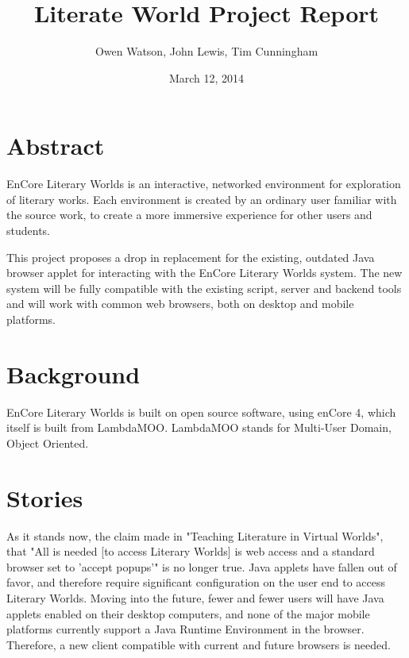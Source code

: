 \documentclass[12pt, letterpaper]{report}
\author{Owen Watson, John Lewis, Tim Cunningham}
\title{Literate World Project Report}
\date{March 12, 2014}
\begin{document}
	\begin{titlepage}
	\Huge \maketitle \par
	\end{titlepage}
	
	\chapter{Abstract}
	\par
	EnCore Literary Worlds is an interactive, networked environment for exploration of literary works. Each environment is created by an ordinary user familiar with the source work, to create a more immersive experience for other users and students.
	
	\par
	This project proposes a drop in replacement for the existing, outdated Java browser applet for interacting with the EnCore Literary Worlds system. The new system will be fully compatible with the existing script, server and backend tools and will work with common web browsers, both on desktop and mobile platforms.
	
	\tableofcontents
	
	\chapter{Background}
	\par
	EnCore Literary Worlds is built on open source software, using enCore 4, which itself is built from LambdaMOO. LambdaMOO stands for Multi-User Domain, Object Oriented.
	
	
	\chapter{Stories}
	
	\par
	As it stands now, the claim made in "Teaching Literature in Virtual Worlds", that "All is needed [to access Literary Worlds] is web access and a standard browser set to 'accept popups'" is no longer true. Java applets have fallen out of favor, and therefore require significant configuration on the user end to access Literary Worlds. Moving into the future, fewer and fewer users will have Java applets enabled on their desktop computers, and none of the major mobile platforms currently support a Java Runtime Environment in the browser. Therefore, a new client compatible with current and future browsers is needed.
	
\end{document}
